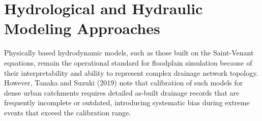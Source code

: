 \section{Hydrological and Hydraulic Modeling Approaches}
Physically based hydrodynamic models, such as those built on the Saint-Venant equations, remain the operational standard for floodplain simulation because of their interpretability and ability to represent complex drainage network topology. However, Tanaka and Suzuki (2019) note that calibration of such models for dense urban catchments requires detailed as-built drainage records that are frequently incomplete or outdated, introducing systematic bias during extreme events that exceed the calibration range.
